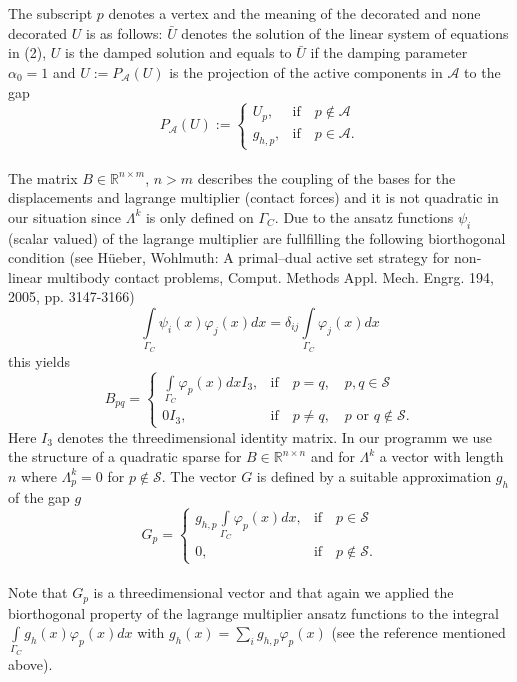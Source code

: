 \documentclass{article}
\begin{document}
\noindent
The subscript $p$ denotes a vertex and the meaning of the
decorated and none decorated $U$ is as follows: $\bar U$ denotes the solution of the linear system of equations in (2), $U$ is the
damped solution and equals to $\bar U$ if the damping parameter $\alpha_0 =
1$ and $\hat U := P_{\mathcal{A}}(U)$ is the projection of the active
components in $\mathcal{A}$ to the gap
$$P_{\mathcal{A}}(U):=\begin{cases}
U_p, & \textrm{if}\quad p\notin\mathcal{A}\\
g_{h,p}, & \textrm{if}\quad
p\in\mathcal{A}.
\end{cases}$$\\
The matrix $B\in\mathbb{R}^{n\times m}$, $n>m$ describes the coupling of the
bases for the displacements and lagrange multiplier (contact forces)
and it is not quadratic in our situation since $\Lambda^k$ is only defined on
$\Gamma_C$. Due to the ansatz functions $\psi_i$ (scalar valued) of the
lagrange multiplier are fullfilling the following biorthogonal condition (see Hüeber, Wohlmuth: A primal–dual active
set strategy for non-linear multibody contact problems, Comput. Methods Appl. Mech. Engrg.
194, 2005, pp. 3147-3166)
$$ \int\limits_{\Gamma_C}\psi_i(x)\varphi_j(x)dx =
\delta_{ij}\int\limits_{\Gamma_C}\varphi_j(x)dx$$
this yields
$$B_{pq} = \begin{cases}
\int\limits_{\Gamma_C}\varphi_p(x)dxI_3, & \text{if}\quad p=q,\quad
p,q\in\mathcal{S}\\
0I_3, & \text{if}\quad p\neq q,\quad p\textrm{ or }q\notin\mathcal{S}.
\end{cases}$$
Here $I_3$ denotes the threedimensional identity matrix.
In our programm we use the structure of a quadratic sparse for
$B\in\mathbb{R}^{n\times n}$ and for $\Lambda^k$ a vector with length $n$ where
$\Lambda^k_p = 0$ for $p\notin \mathcal{S}$.
The vector $G$ is defined by a suitable approximation $g_h$ of the gap $g$
$$G_p = \begin{cases}
g_{h,p}\int\limits_{\Gamma_C}\varphi_p(x)dx, & \text{if}\quad p\in\mathcal{S}\\
0, & \text{if}\quad p\notin\mathcal{S}.
\end{cases}$$\\
Note that $G_p$ is a threedimensional vector and that again we applied the
biorthogonal property of the lagrange multiplier ansatz functions to the
integral $\int\limits_{\Gamma_C}g_h(x)\varphi_p(x)dx$ with $g_h(x)=\sum\limits_i
g_{h,p}\varphi_p(x)$ (see the reference mentioned above).\\
\end{document}
